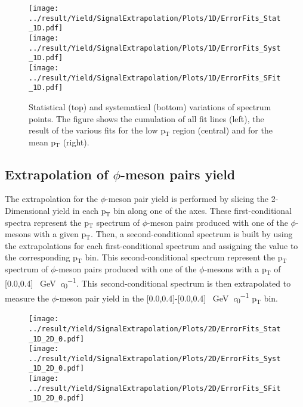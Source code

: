 \begin{figure}[!h]
\centering
\texttt{[image: ../result/Yield/SignalExtrapolation/Plots/1D/ErrorFits\_Stat\_1D.pdf]}\\
\texttt{[image: ../result/Yield/SignalExtrapolation/Plots/1D/ErrorFits\_Syst\_1D.pdf]}\\
\texttt{[image: ../result/Yield/SignalExtrapolation/Plots/1D/ErrorFits\_SFit\_1D.pdf]}
\caption{Statistical (top) and systematical (bottom) variations of spectrum points. The figure shows the cumulation of all fit lines (left), the result of the various fits for the low p$_{\text{T}}$ region (central) and for the mean p$_{\text{T}}$ (right).}
\label{fig:Extrap1D}
\end{figure}

\subsection{Extrapolation of $\phi$-meson pairs yield}
The extrapolation for the $\phi$-meson pair yield is performed by slicing the 2-Dimensional yield in each p$_{\text{T}}$ bin along one of the axes. These first-conditional spectra represent the p$_{\text{T}}$ spectrum of $\phi$-meson pairs produced with one of the $\phi$-mesons with a given p$_{\text{T}}$. Then, a second-conditional spectrum is built by using the extrapolations for each first-conditional spectrum and assigning the value to the corresponding p$_{\text{T}}$ bin. This second-conditional spectrum represent the p$_{\text{T}}$ spectrum of $\phi$-meson pairs produced with one of the $\phi$-mesons with a p$_{\text{T}}$ of [0.0,0.4] \SI{}{\giga\electronvolt\per\clight}. This second-conditional spectrum is then extrapolated to measure the $\phi$-meson pair yield in the [0.0,0.4]-[0.0,0.4] \SI{}{\giga\electronvolt\per\clight} p$_{\text{T}}$ bin.\\

\begin{figure}
\centering
\texttt{[image: ../result/Yield/SignalExtrapolation/Plots/2D/ErrorFits\_Stat\_1D\_2D\_0.pdf]}\\
\texttt{[image: ../result/Yield/SignalExtrapolation/Plots/2D/ErrorFits\_Syst\_1D\_2D\_0.pdf]}\\
\texttt{[image: ../result/Yield/SignalExtrapolation/Plots/2D/ErrorFits\_SFit\_1D\_2D\_0.pdf]}
\label{fig:Extrap2D_0}
\caption{}
\end{figure}

